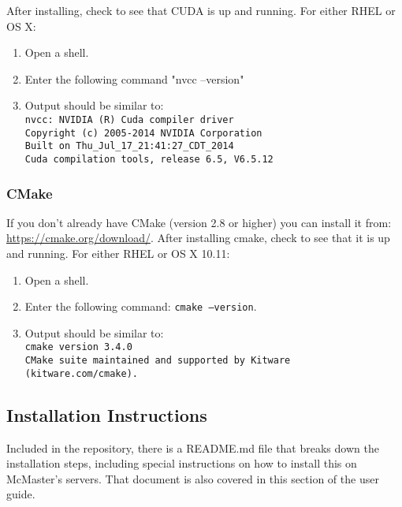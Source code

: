 \documentclass[12pt]{article}
\begin{document}
After installing, check to see that CUDA is up and running. For either RHEL or OS X:
\begin{enumerate}
\item Open a shell.
\item Enter the following command "nvcc --version"
\item Output should be similar to:\\
\texttt{nvcc: NVIDIA (R) Cuda compiler driver}\\
\texttt{Copyright (c) 2005-2014 NVIDIA Corporation}\\
\texttt{Built on Thu\_Jul\_17\_21:41:27\_CDT\_2014}\\
\texttt{Cuda compilation tools, release 6.5, V6.5.12}\\
\end{enumerate}


\subsubsection{CMake}
If you don't already have CMake (version 2.8 or higher) you can install it from: \url{https://cmake.org/download/}. After installing cmake, check to see that it is up and running. For either RHEL or OS X 10.11:
\begin{enumerate}
\item Open a shell.
\item Enter the following command: \texttt{cmake --version}.
\item Output should be similar to:\\
\texttt{cmake version 3.4.0}\\
\texttt{CMake suite maintained and supported by Kitware (kitware.com/cmake).}
\end{enumerate}

\subsection{Installation Instructions} %
Included in the repository, there is a README.md file that breaks down the installation steps, including special instructions on how to install this on McMaster's servers. That document is also covered in this section of the user guide.
\end{document}
